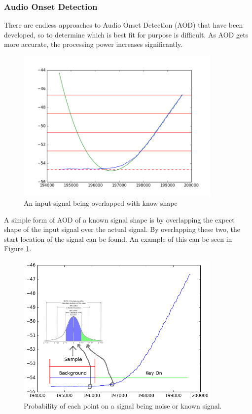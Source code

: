\documentclass{article}
\begin{document}
\subsubsection{Audio Onset Detection}
There are endless approaches to Audio Onset Detection (AOD) that have been developed, so to determine which is best fit for purpose is difficult. As AOD gets more accurate, the processing power increases significantly.\\

\begin{figure}
	\centering
	\includegraphics[width=10cm]{signalShapeOverlay}
	\caption{An input signal being overlapped with know shape}
	\label{fig:signalShapeOverlay}
\end{figure}

A simple form of AOD of a known signal shape is by overlapping the expect shape of the input signal over the actual signal. By overlapping these two, the start location of the signal can be found. An example of this can be seen in Figure \ref{fig:signalShapeOverlay}.\\

\begin{figure}
	\centering
	\includegraphics[width=10cm]{signalProbablity}
	\caption{Probability of each point on a signal being noise or known signal.}
	\label{fig:signalProb}
\end{figure}
\end{document}
